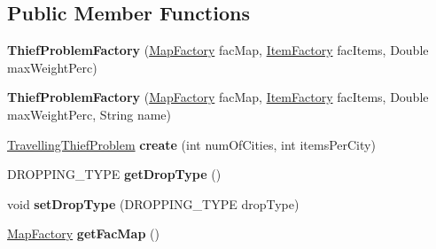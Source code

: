 \subsection*{Public Member Functions}
\begin{DoxyCompactItemize}
\item 
\hypertarget{classcom_1_1msu_1_1thief_1_1factory_1_1ThiefProblemFactory_a8aefd104d204b50b7d28f76e4b298b99}{{\bfseries Thief\-Problem\-Factory} (\hyperlink{classcom_1_1msu_1_1thief_1_1factory_1_1map_1_1MapFactory}{Map\-Factory} fac\-Map, \hyperlink{classcom_1_1msu_1_1thief_1_1factory_1_1items_1_1ItemFactory}{Item\-Factory} fac\-Items, Double max\-Weight\-Perc)}\label{classcom_1_1msu_1_1thief_1_1factory_1_1ThiefProblemFactory_a8aefd104d204b50b7d28f76e4b298b99}

\item 
\hypertarget{classcom_1_1msu_1_1thief_1_1factory_1_1ThiefProblemFactory_acb89875dc4e53818403d1c2d75f52724}{{\bfseries Thief\-Problem\-Factory} (\hyperlink{classcom_1_1msu_1_1thief_1_1factory_1_1map_1_1MapFactory}{Map\-Factory} fac\-Map, \hyperlink{classcom_1_1msu_1_1thief_1_1factory_1_1items_1_1ItemFactory}{Item\-Factory} fac\-Items, Double max\-Weight\-Perc, String name)}\label{classcom_1_1msu_1_1thief_1_1factory_1_1ThiefProblemFactory_acb89875dc4e53818403d1c2d75f52724}

\item 
\hypertarget{classcom_1_1msu_1_1thief_1_1factory_1_1ThiefProblemFactory_ab1973fba70b16cba2e3bde7487348f30}{\hyperlink{classcom_1_1msu_1_1thief_1_1problems_1_1TravellingThiefProblem}{Travelling\-Thief\-Problem} {\bfseries create} (int num\-Of\-Cities, int items\-Per\-City)}\label{classcom_1_1msu_1_1thief_1_1factory_1_1ThiefProblemFactory_ab1973fba70b16cba2e3bde7487348f30}

\item 
\hypertarget{classcom_1_1msu_1_1thief_1_1factory_1_1ThiefProblemFactory_ad0d5e76dda951d5afc7c65ecf0144715}{D\-R\-O\-P\-P\-I\-N\-G\-\_\-\-T\-Y\-P\-E {\bfseries get\-Drop\-Type} ()}\label{classcom_1_1msu_1_1thief_1_1factory_1_1ThiefProblemFactory_ad0d5e76dda951d5afc7c65ecf0144715}

\item 
\hypertarget{classcom_1_1msu_1_1thief_1_1factory_1_1ThiefProblemFactory_ac2117b063c88fb607d2d112c4a129465}{void {\bfseries set\-Drop\-Type} (D\-R\-O\-P\-P\-I\-N\-G\-\_\-\-T\-Y\-P\-E drop\-Type)}\label{classcom_1_1msu_1_1thief_1_1factory_1_1ThiefProblemFactory_ac2117b063c88fb607d2d112c4a129465}

\item 
\hypertarget{classcom_1_1msu_1_1thief_1_1factory_1_1ThiefProblemFactory_aa700094ef4d896d26854cdacb858ef77}{\hyperlink{classcom_1_1msu_1_1thief_1_1factory_1_1map_1_1MapFactory}{Map\-Factory} {\bfseries get\-Fac\-Map} ()}\label{classcom_1_1msu_1_1thief_1_1factory_1_1ThiefProblemFactory_aa700094ef4d896d26854cdacb858ef77}


\end{DoxyCompactItemize}
